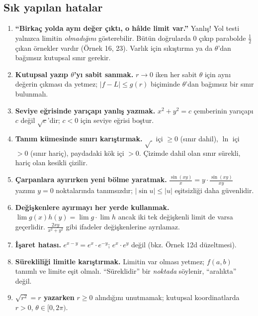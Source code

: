 \subsection{Sık yapılan hatalar}

\begin{dikkat}
\begin{enumerate}
  \item \textbf{``Birkaç yolda aynı değer çıktı, o hâlde limit var.''} Yanlış! Yol testi yalnızca limitin
        \emph{olmadığını} gösterebilir. Bütün doğrularda $0$ çıkıp parabolde $\frac12$ çıkan örnekler vardır
        (Örnek 16, 23). Varlık için sıkıştırma ya da $\theta$'dan bağımsız kutupsal sınır gerekir.
  \item \textbf{Kutupsal yazıp $\theta$'yı sabit sanmak.} $r\to0$ iken her sabit $\theta$ için aynı değerin çıkması da
        yetmez; $|f-L|\le g(r)$ biçiminde $\theta$'dan bağımsız bir sınır bulunmalı.
  \item \textbf{Seviye eğrisinde yarıçapı yanlış yazmak.} $x^2+y^2=c$ çemberinin yarıçapı $c$ değil $\sqrt c$'dir;
        $c<0$ için seviye eğrisi boştur.
  \item \textbf{Tanım kümesinde sınırı karıştırmak.} $\sqrt{\ }$ içi $\ge0$ (sınır dahil), $\ln$ içi $>0$ (sınır hariç),
        paydadaki kök içi $>0$. Çizimde dahil olan sınır sürekli, hariç olan kesikli çizilir.
  \item \textbf{Çarpanlara ayırırken yeni bölme yaratmak.} $\frac{\sin(xy)}{x}=y\cdot\frac{\sin(xy)}{xy}$ yazımı
        $y=0$ noktalarında tanımsızdır; $|\sin u|\le|u|$ eşitsizliği daha güvenlidir.
  \item \textbf{Değişkenlere ayırmayı her yerde kullanmak.} $\lim g(x)h(y)=\lim g\cdot\lim h$ ancak iki tek değişkenli
        limit de varsa geçerlidir. $\frac{2xy}{x^2+y^2}$ gibi ifadeler değişkenlerine ayrılamaz.
  \item \textbf{İşaret hatası.} $e^{x-y}=e^x\cdot e^{-y}$; $e^x\cdot e^y$ değil (bkz. Örnek 12d düzeltmesi).
  \item \textbf{Sürekliliği limitle karıştırmak.} Limitin var olması yetmez; $f(a,b)$ tanımlı ve limite eşit olmalı.
        ``Süreklidir'' bir \emph{noktada} söylenir, ``aralıkta'' değil.
  \item \textbf{$\sqrt{r^2}=r$ yazarken} $r\ge0$ alındığını unutmamak; kutupsal koordinatlarda $r>0$, $\theta\in[0,2\pi)$.
\end{enumerate}
\end{dikkat}

